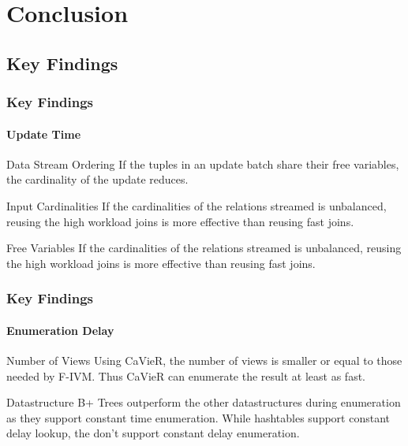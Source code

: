 \documentclass[
	11pt, %
]{beamer}
\begin{document}
\section{Conclusion}
\subsection{Key Findings}
\begin{frame}
	\frametitle{Key Findings}
	\framesubtitle{Update Time}
	\begin{block}{Data Stream Ordering}
		If the tuples in an update batch share their free variables, the cardinality of the update reduces.
	\end{block}
	\begin{block}{Input Cardinalities}
		If the cardinalities of the relations streamed is unbalanced, reusing the high workload joins is more effective than reusing fast joins.
	\end{block}
	\begin{block}{Free Variables}
		If the cardinalities of the relations streamed is unbalanced, reusing the high workload joins is more effective than reusing fast joins.
	\end{block}
\end{frame}

\begin{frame}
	\frametitle{Key Findings}
	\framesubtitle{Enumeration Delay}
	\begin{block}{Number of Views}
		Using CaVieR, the number of views is smaller or equal to those needed by F-IVM. Thus CaVieR can enumerate the result at least as fast.
	\end{block}
	\begin{block}{Datastructure}
		B+ Trees outperform the other datastructures during enumeration as they support constant time enumeration. While hashtables support constant delay lookup, the don't support constant delay enumeration.
	\end{block}
\end{frame}
\end{document}
